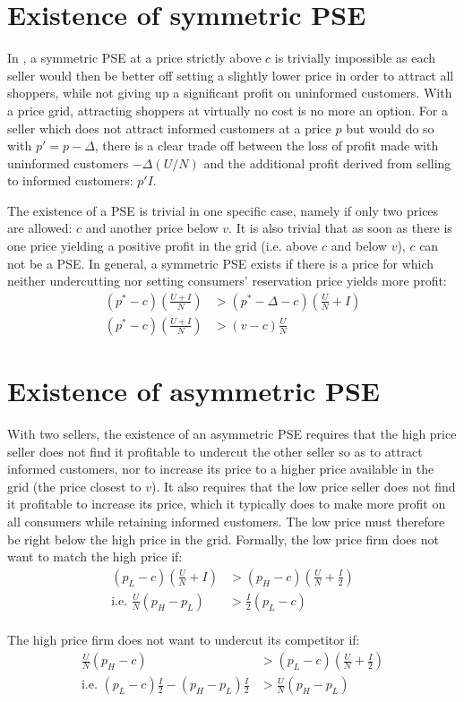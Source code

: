 \documentclass[11pt]{article}
\begin{document}
\section{Existence of symmetric PSE}

In \cite{VAR80}, a symmetric PSE at a price strictly above $c$ is trivially impossible as each seller would then be better off setting a slightly lower price in order to attract all shoppers, while not giving up a significant profit on uninformed customers. With a price grid, attracting shoppers at virtually no cost is no more an option. For a seller which does not attract informed customers at a price $p$ but would do so with $p'=p-\Delta$, there is a clear trade off between the loss of profit made with uninformed customers $-\Delta(U/N)$ and the additional profit derived from selling to informed customers: $p' I$.

The existence of a PSE is trivial in one specific case, namely if only two prices are allowed: $c$ and another price below $v$. It is also trivial that as soon as there is one price yielding a positive profit in the grid (i.e. above $c$ and below $v$), $c$ can not be a PSE. In general, a symmetric PSE exists if there is a price for which neither undercutting nor setting consumers' reservation price yields more profit:
\begin{align*}
(p^* - c)(\frac{U + I}{N}) & > (p^{*} -\Delta - c)(\frac{U}{N} + I) \\
(p^* - c)(\frac{U + I}{N}) & > (v-c) \frac{U}{N}
\end{align*}

\section{Existence of asymmetric PSE}

With two sellers, the existence of an asymmetric PSE requires that the high price seller does not find it profitable to undercut the other seller so as to attract informed customers, nor to increase its price to a higher price available in the grid (the price closest to $v$). It also requires that the low price seller does not find it profitable to increase its price, which it typically does to make more profit on all consumers while retaining informed customers. The low price must therefore be right below the high price in the grid. Formally, the low price firm does not want to match the high price if:
\begin{align*}
(p_L - c) \left( \frac{U}{N} + I \right) & > (p_H - c) \left( \frac{U}{N} + \frac{I}{2} \right) \\
\text{i.e. } \frac{U}{N} \left( p_H - p_L \right) & > \frac{I}{2} \left( p_L - c \right)
\end{align*}
\ \\
The high price firm does not want to undercut its competitor if:
\begin{align*}
\frac{U}{N}  (p_H - c) & > (p_L - c)(\frac{U}{N} + \frac{I}{2}) \\
\text{i.e. } (p_L - c) \frac{I}{2} - (p_H - p_L) \frac{I}{2} & > \frac{U}{N} (p_H - p_L)
\end{align*}
\end{document}
